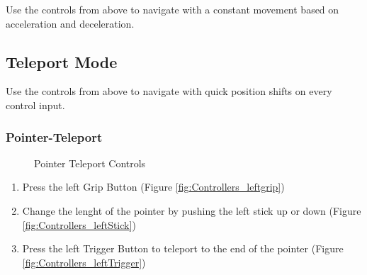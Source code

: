 \documentclass[notitlepage]{article}
\begin{document}
Use the controls from above to navigate with a constant movement based on acceleration and deceleration.

\qquad
\subsection{Teleport Mode}

Use the controls from above to navigate with quick position shifts on every control input.

\newpage
\subsubsection{Pointer-Teleport}

\begin{figure}[H]
   \centering
    \quad
    \quad
    \caption{Pointer Teleport Controls}\label{fig:UI-Interaction}%
\end{figure}

\begin{enumerate}
\item Press the left Grip Button (Figure \ref{fig:Controllers_leftgrip}) \\
\item Change the lenght of the pointer by pushing the left stick up or down (Figure \ref{fig:Controllers_leftStick})\\
\item Press the left Trigger Button to teleport to the end of the pointer (Figure \ref{fig:Controllers_leftTrigger})
\end{enumerate} 
\end{document}
